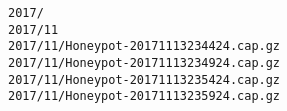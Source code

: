 \begin{verbatim}
2017/
2017/11
2017/11/Honeypot-20171113234424.cap.gz
2017/11/Honeypot-20171113234924.cap.gz
2017/11/Honeypot-20171113235424.cap.gz
2017/11/Honeypot-20171113235924.cap.gz
\end{verbatim}
